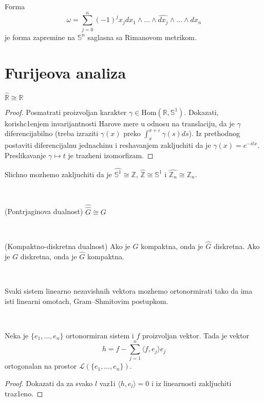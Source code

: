 \documentclass[a4paper,12pt]{article}
\newcommand{\ZZ}{\mathbb{Z}}
\newcommand{\RR}{\mathbb{R}}
\newcommand{\eps}{\varepsilon}
\begin{document}
\begin{tvr}
	Forma 
	\[ \omega = \sum_{j= 0}^n (-1)^j x_j dx_1 \wedge \dotso \wedge \widehat{dx_j} \wedge \dotso\wedge dx_n \] 
	je forma zapremine na $\mathbb{S}^n$ saglasna sa Rimanovom metrikom.
\end{tvr}


\section{Furijeova analiza}

\begin{tvr}
	$\widehat{\RR} \cong \RR$
\end{tvr}
\begin{proof}
	Posmatrati proizvoljan karakter $\gamma\in \mathrm{Hom}(\RR, \mathbb{S}^1)$. Dokazati, korish\-c1enjem invari\-jantnosti
	Harove mere u odnosu na translaciju, da je $\gamma$ diferencijabilno (treba izraziti $\gamma(x)$ preko $\int_x^{x+\eps}\gamma(s)ds$).
	Iz prethodnog postaviti diferencijalnu jednachinu i reshavanjem zakljuchiti da je $\gamma(x) = e^{-itx}$. Preslikavanje $\gamma\mapsto t$
	je trazheni izomorfizam.
\end{proof}

\begin{nap}
	Slichno mozhemo zakljuchiti da je $\widehat{\mathbb{S}^1} \cong \ZZ$, $\widehat{\ZZ} \cong \mathbb{S}^1$ i $\widehat{\ZZ_n} \cong \ZZ_n$.
\end{nap}\\

\begin{tma}(Pontrjaginova dualnost)
	$\widehat{\widehat{G}} \cong G$
\end{tma}\\

\begin{tma}(Kompaktno-diskretna dualnost)
	Ako je $G$ kompaktna, onda je $\widehat{G}$ diskretna. Ako je $G$ diskretna, onda je $\widehat{G}$ kompaktna.
\end{tma}\\

\begin{nap}
	Svaki sistem linearno nezavishnih vektora mozhemo ortonormirati tako da ima isti linearni omotach, 
	Gram--Shmitovim postupkom.
\end{nap}\\



\begin{lema}
Neka je $\{e_1, \dots, e_n\}$ ortonormiran sistem i $f$ proizvoljan vektor. Tada je vektor 
\[h = f - \sum_{j=1}^n \langle f, e_j \rangle e_j\]
ortogonalan na prostor $\mathcal{L}(\{e_1, \dots, e_n\})$.
\end{lema}
\begin{proof}
Dokazati da za svako $l$ vaz1i $\langle h, e_l \rangle = 0$ i iz linearnosti zakljuchiti traz1eno.
\end{proof}
\end{document}
